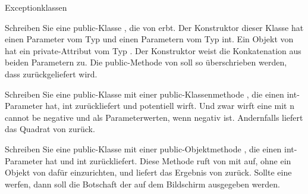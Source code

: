 \documentclass{../preamble}
\begin{document}
\clearpage

\begin{task}[credit = \stars{2}{3}]{Exceptionklassen}
    \begin{subtask}
        Schreiben Sie eine \textcolor{keywordcolor}{public}-Klasse , die von  erbt. Der Konstruktor dieser Klasse hat einen Parameter  vom  Typ  und einen Parametern vom Typ \textcolor{keywordcolor}{int}. Ein Objekt von  hat  ein \textcolor{keywordcolor}{private}-Attribut  vom  Typ . Der Konstruktor weist  die Konkatenation aus beiden Parametern zu. Die \textcolor{keywordcolor}{public}-Methode  von  soll so überschrieben werden, dass  zurückgeliefert wird.

        \begin{solution}
            
        \end{solution}
    \end{subtask}

    \begin{subtask}
        Schreiben Sie eine \textcolor{keywordcolor}{public}-Klasse  mit einer \textcolor{keywordcolor}{public}-Klassenmethode , die einen \textcolor{keywordcolor}{int}-Parameter  hat, \textcolor{keywordcolor}{int} zurückliefert und  potentiell  wirft. Und zwar wirft  eine  mit \grqq n cannot be negative\grqq{} und  als Parameterwerten, wenn negativ ist. Andernfalls liefert  das Quadrat von  zurück.

        \begin{solution}
            
        \end{solution}
    \end{subtask}

    \clearpage

    \begin{subtask}
        Schreiben Sie eine \textcolor{keywordcolor}{public}-Klasse  mit einer \textcolor{keywordcolor}{public}-Objektmethode , die einen \textcolor{keywordcolor}{int}-Parameter  hat und \textcolor{keywordcolor}{int} zurückliefert. Diese Methode ruft  von  mit  auf, ohne ein Objekt von  dafür einzurichten, und liefert das Ergebnis von  zurück. Sollte  eine  werfen, dann soll die Botschaft der  auf dem Bildschirm ausgegeben werden.

        \begin{solution}
            
        \end{solution}
    \end{subtask}
\end{task}
\end{document}
